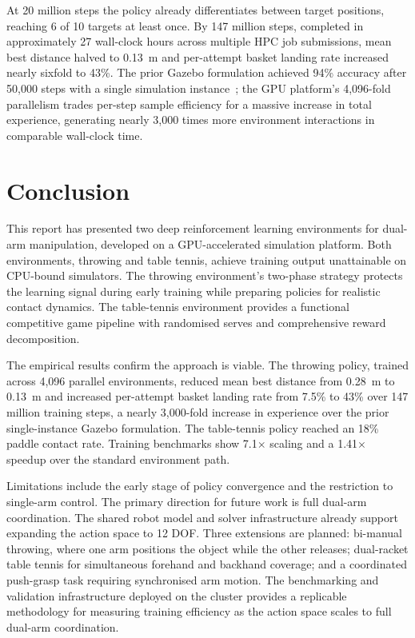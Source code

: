 \documentclass[11pt, a4paper]{article}
\begin{document}
At 20 million steps the policy already differentiates between target positions, reaching 6 of 10 targets at least once. By 147 million steps, completed in approximately 27 wall-clock hours across multiple HPC job submissions, mean best distance halved to 0.13~m and per-attempt basket landing rate increased nearly sixfold to 43\%. The prior Gazebo formulation achieved 94\% accuracy after 50,000 steps with a single simulation instance~\cite{kasaei2023learning}; the GPU platform's 4,096-fold parallelism trades per-step sample efficiency for a massive increase in total experience, generating nearly 3,000 times more environment interactions in comparable wall-clock time.

\section{Conclusion}
\label{sec:conclusion}

This report has presented two deep reinforcement learning environments for dual-arm manipulation, developed on a GPU-accelerated simulation platform. Both environments, throwing and table tennis, achieve training output unattainable on CPU-bound simulators. The throwing environment's two-phase strategy protects the learning signal during early training while preparing policies for realistic contact dynamics. The table-tennis environment provides a functional competitive game pipeline with randomised serves and comprehensive reward decomposition.

The empirical results confirm the approach is viable. The throwing policy, trained across 4,096 parallel environments, reduced mean best distance from 0.28~m to 0.13~m and increased per-attempt basket landing rate from 7.5\% to 43\% over 147 million training steps, a nearly 3,000-fold increase in experience over the prior single-instance Gazebo formulation. The table-tennis policy reached an 18\% paddle contact rate. Training benchmarks show 7.1$\times$ scaling and a 1.41$\times$ speedup over the standard environment path.

Limitations include the early stage of policy convergence and the restriction to single-arm control. The primary direction for future work is full dual-arm coordination. The shared robot model and solver infrastructure already support expanding the action space to 12 DOF. Three extensions are planned: bi-manual throwing, where one arm positions the object while the other releases; dual-racket table tennis for simultaneous forehand and backhand coverage; and a coordinated push-grasp task requiring synchronised arm motion. The benchmarking and validation infrastructure deployed on the cluster provides a replicable methodology for measuring training efficiency as the action space scales to full dual-arm coordination.
\end{document}
